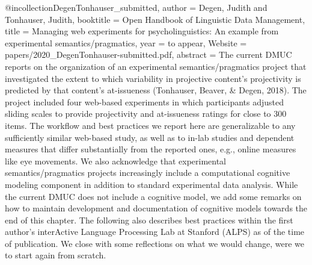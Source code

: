 {@incollection{DegenTonhauser_submitted,
author = {Degen, Judith and Tonhauser, Judith},
booktitle = {Open Handbook of Linguistic Data Management},
title = {{Managing web experiments for psycholinguistics: An example from experimental semantics/pragmatics}},
year = {to appear},
Website = {papers/2020_DegenTonhauser-submitted.pdf},
abstract = {The current DMUC reports on the organization of an experimental semantics/pragmatics project that investigated the extent to which variability in projective content’s projectivity is predicted by that content’s at-issueness (Tonhauser, Beaver, & Degen, 2018). The project included four web-based experiments in which participants adjusted sliding scales to provide projectivity and at-issueness ratings for close to 300 items. The workflow and best practices we report here are generalizable to any sufficiently similar web-based study, as well as to in-lab studies and dependent measures that differ substantially from the reported ones, e.g., online measures like eye movements. We also acknowledge that experimental semantics/pragmatics projects increasingly include a computational cognitive modeling component in addition to standard experimental data analysis. While the current DMUC does not include a cognitive model, we add some remarks on how to maintain development and documentation of cognitive models towards the end of this chapter. The following also describes best practices within the first author’s interActive Language Processing Lab at Stanford (ALPS) as of the time of publication. We close with some reflections on what we would change, were we to start again from scratch.}
}

}
